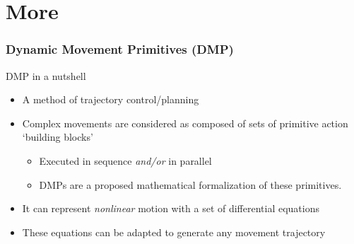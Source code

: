 \documentclass[aspectratio=43,11pt,xcolor={dvipsnames}]{beamer}
\begin{document}

\appendix
\section{More}
\begin{frame}[noframenumbering,label=supplemental]
	\frametitle{Dynamic Movement Primitives (DMP)}
	\linespread{1.2}
										
	\begin{exampleblock}{DMP in a nutshell}
		\begin{itemize}
			\item A method of trajectory control/planning\footnotemark
			\item Complex movements are considered as composed of sets of primitive action ‘building blocks’
			      \begin{itemize}
			      	\item Executed in sequence \textit{and/or} in parallel
			      	\item DMPs are a proposed mathematical formalization of these primitives.
			      \end{itemize}
			\item It can represent \textit{nonlinear} motion with a set of differential equations
			\item These equations can be adapted to generate any movement trajectory
		\end{itemize}
	\end{exampleblock}
		
\end{frame}
\end{document}

